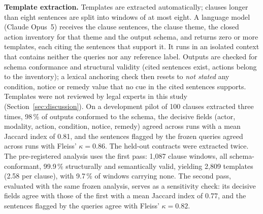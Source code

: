 \textbf{Template extraction.} Templates are extracted automatically; clauses longer than eight sentences are split into windows of at most eight. A language model (Claude Opus~5) receives the clause sentences, the clause theme, the closed action inventory for that theme and the output schema, and returns zero or more templates, each citing the sentences that support it. It runs in an isolated context that contains neither the queries nor any reference label. Outputs are checked for schema conformance and structural validity (cited sentences exist, actions belong to the inventory); a lexical anchoring check then resets to \emph{not stated} any condition, notice or remedy value that no cue in the cited sentences supports. Templates were not reviewed by legal experts in this study (Section~\ref{sec:discussion}). On a development pilot of 100 clauses extracted three times, 98\,\% of outputs conformed to the schema, the decisive fields (actor, modality, action, condition, notice, remedy) agreed across runs with a mean Jaccard index of 0.81, and the sentences flagged by the frozen queries agreed across runs with Fleiss' $\kappa = 0.86$. The held-out contracts were extracted twice. The pre-registered analysis uses the first pass: 1,087 clause windows, all schema-conformant, 99.9\,\% structurally and semantically valid, yielding 2,809 templates (2.58 per clause), with 9.7\,\% of windows carrying none. The second pass, evaluated with the same frozen analysis, serves as a sensitivity check: its decisive fields agree with those of the first with a mean Jaccard index of 0.77, and the sentences flagged by the queries agree with Fleiss' $\kappa = 0.82$.
